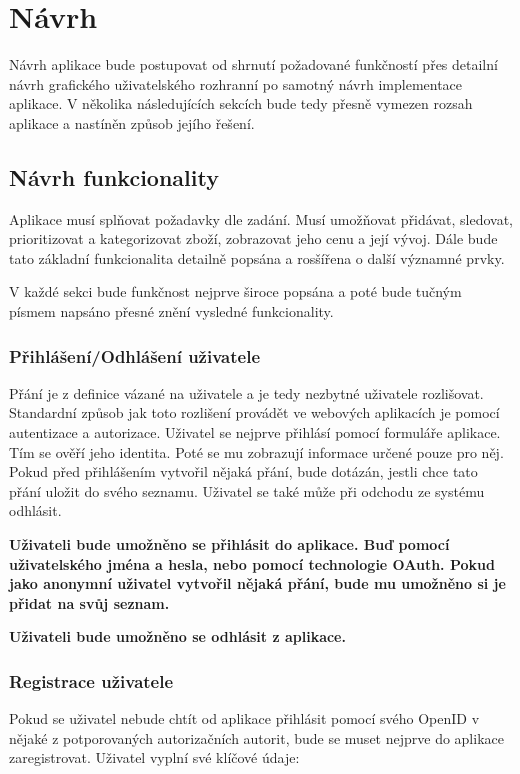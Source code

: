 \chapter{Návrh}
Návrh aplikace bude postupovat od shrnutí požadované funkčností přes detailní návrh grafického uživatelského rozhranní po samotný návrh implementace aplikace. V několika následujících sekcích bude tedy přesně vymezen rozsah aplikace a nastíněn způsob jejího řešení.

\section{Návrh funkcionality}
Aplikace musí splňovat požadavky dle zadání. Musí umožňovat přidávat, sledovat, prioritizovat a kategorizovat zboží, zobrazovat jeho cenu a její vývoj. Dále bude tato základní funkcionalita detailně popsána a rosšířena o další významné prvky.

V každé sekci bude funkčnost nejprve široce popsána a poté bude tučným písmem napsáno přesné znění vysledné funkcionality.

\subsection{Přihlášení/Odhlášení uživatele}
Přání je z definice vázané na uživatele a je tedy nezbytné uživatele rozlišovat. Standardní způsob jak toto rozlišení provádět ve webových aplikacích je pomocí autentizace a autorizace. Uživatel se nejprve přihlásí pomocí formuláře aplikace. Tím se ověří jeho identita. Poté se mu zobrazují informace určené pouze pro něj. Pokud před přihlášením vytvořil nějaká přání, bude dotázán, jestli chce tato přání uložit do svého seznamu. Uživatel se také může při odchodu ze systému odhlásit.

\textbf{Uživateli bude umožněno se přihlásit do aplikace. Buď pomocí uživatelského jména a hesla, nebo pomocí technologie OAuth. Pokud jako anonymní uživatel vytvořil nějaká přání, bude mu umožněno si je přidat na svůj seznam.}

\textbf{Uživateli bude umožněno se odhlásit z aplikace.}

\subsection{Registrace uživatele}
Pokud se uživatel nebude chtít od aplikace přihlásit pomocí svého OpenID v nějaké z potporovaných autorizačních autorit, bude se muset nejprve do aplikace zaregistrovat. Uživatel vyplní své klíčové údaje:

